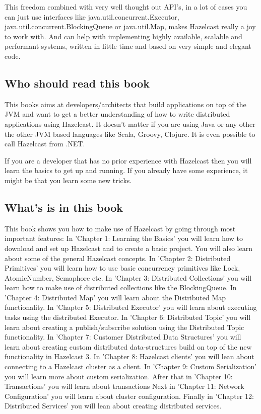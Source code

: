 This freedom combined with very well thought out API's, in a lot of cases you can just use interfaces like java.util.concurrent.Executor, java.util.concurrent.BlockingQueue or java.util.Map, makes Hazelcast really a joy to work with. And can help with implementing highly available, scalable and performant systems, written in little time and based on very simple and elegant code.

\subsection*{Who should read this book}
This books aims at developers/architects that build applications on top of the JVM and want to get a better understanding of how to write distributed applications using Hazelcast. It doesn't matter if you are using Java or any other the other JVM based languages like Scala, Groovy, Clojure. It is even possible to call Hazelcast from .NET.

If you are a developer that has no prior experience with Hazelcast then you will learn the basics to get up and running. If you already have some experience, it might be that you learn some new tricks.
 
\subsection*{What's is in this book}
This book shows you how to make use of Hazelcast by going through most important features:
In 'Chapter 1: Learning the Basics' you will learn how to download and set up Hazelcast and to create a basic project. You will also learn about some of the general Hazelcast concepts.
In 'Chapter 2: Distributed Primitives' you will learn how to use basic concurrency primitives like Lock, AtomicNumber, Semaphore etc.
In 'Chapter 3: Distributed Collections' you will learn how to make use of distributed collections like the BlockingQueue.
In 'Chapter 4: Distributed Map' you will learn about the Distributed Map functionality.
In 'Chapter 5: Distributed Executor' you will learn about executing tasks using the distributed Executor.
In 'Chapter 6: Distributed Topic' you will learn about creating a publish/subscribe solution using the Distributed Topic functionality.
In 'Chapter 7: Customer Distributed Data Structures' you will learn about creating custom distributed data-structures build on top of the new functionality in Hazelcast 3.
In 'Chapter 8: Hazelcast clients' you will lean about connecting to a Hazelcast cluster as a client.
In 'Chapter 9: Custom Serialization' you will learn more about custom serialization.  
After that in 'Chapter 10: Transactions' you will learn about transactions
Next in 'Chapter 11: Network Configuration' you will learn about cluster configuration.
Finally in 'Chapter 12: Distributed Services' you will lean about creating distributed services.

